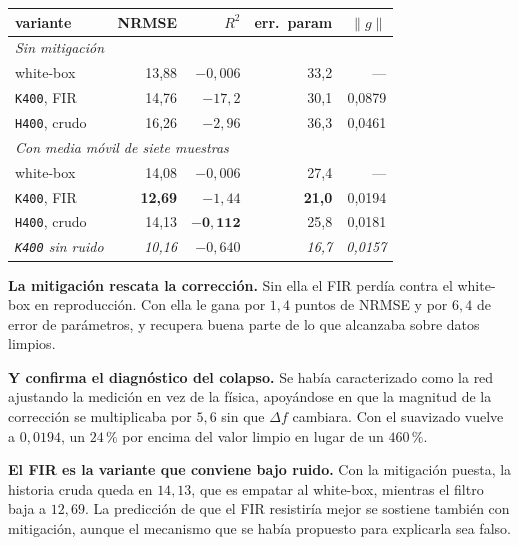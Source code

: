 \documentclass[11pt,a4paper]{article}
\begin{document}
\begin{center}
\small
\begin{tabular}{lrrrr}
\toprule
\textbf{variante} & \textbf{NRMSE} & \textbf{$R^2$} & \textbf{err.\ param} &
\textbf{$\lVert g \rVert$} \\
\midrule
\multicolumn{5}{l}{\emph{Sin mitigación}} \\
white-box              & 13{,}88 & $-0{,}006$ & 33{,}2 & --- \\
\texttt{K400}, FIR     & 14{,}76 & $-17{,}2$  & 30{,}1 & 0{,}0879 \\
\texttt{H400}, crudo   & 16{,}26 & $-2{,}96$  & 36{,}3 & 0{,}0461 \\
\midrule
\multicolumn{5}{l}{\emph{Con media móvil de siete muestras}} \\
white-box              & 14{,}08 & $-0{,}006$ & 27{,}4 & --- \\
\rowcolor{suave}
\texttt{K400}, FIR     & \textbf{12{,}69} & $-1{,}44$ & \textbf{21{,}0} & 0{,}0194 \\
\texttt{H400}, crudo   & 14{,}13 & $\mathbf{-0{,}112}$ & 25{,}8 & 0{,}0181 \\
\midrule
\emph{\texttt{K400} sin ruido} & \emph{10{,}16} & \emph{$-0{,}640$} & \emph{16{,}7} & \emph{0{,}0157} \\
\bottomrule
\end{tabular}
\end{center}

\smallskip\par\textbf{La mitigación rescata la corrección.} Sin ella el FIR
perdía contra el white-box en reproducción. Con ella le gana por $1{,}4$ puntos
de NRMSE y por $6{,}4$ de error de parámetros, y recupera buena parte de lo que
alcanzaba sobre datos limpios.

\smallskip\par\textbf{Y confirma el diagnóstico del colapso.} Se había
caracterizado como la red ajustando la medición en vez de la física, apoyándose
en que la magnitud de la corrección se multiplicaba por $5{,}6$ sin que
$\Delta f$ cambiara. Con el suavizado vuelve a $0{,}0194$, un $24\,\%$ por
encima del valor limpio en lugar de un $460\,\%$.

\smallskip\par\textbf{El FIR es la variante que conviene bajo ruido.} Con la
mitigación puesta, la historia cruda queda en $14{,}13$, que es empatar al
white-box, mientras el filtro baja a $12{,}69$. La predicción de que el FIR
resistiría mejor se sostiene también con mitigación, aunque el mecanismo que se
había propuesto para explicarla sea falso.
\end{document}
